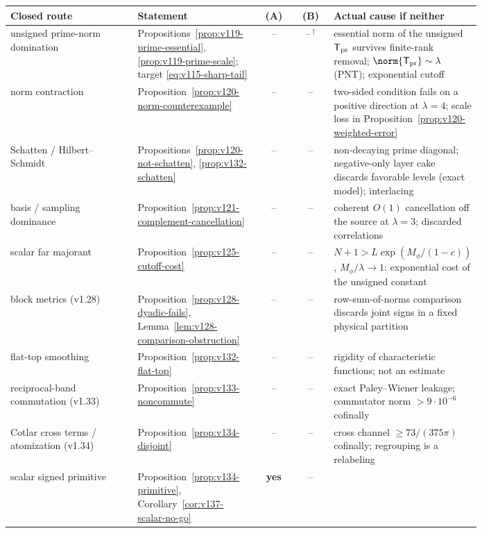 \begin{table}[t]
\centering\small
\setlength{\tabcolsep}{4pt}
\renewcommand{\arraystretch}{1.15}
\begin{tabular}{@{}p{0.27\linewidth}p{0.26\linewidth}cc p{0.26\linewidth}@{}}
\toprule
Closed route & Statement & (A) & (B) & Actual cause if neither\\
\midrule
unsigned prime-norm domination &
Propositions~\ref{prop:v119-prime-essential}, \ref{prop:v119-prime-scale};
target \eqref{eq:v115-sharp-tail} & -- & --\,$^{\dagger}$ &
essential norm of the unsigned $\mathsf T_{\rm pr}$ survives finite-rank
removal; $\norm{\mathsf T_{\rm pr}}\sim\lambda$ (PNT); exponential cutoff\\
norm contraction &
Proposition~\ref{prop:v120-norm-counterexample} & -- & -- &
two-sided condition fails on a positive direction at $\lambda=4$;
scale loss in Proposition~\ref{prop:v120-weighted-error}\\
Schatten / Hilbert--Schmidt &
Propositions~\ref{prop:v120-not-schatten}, \ref{prop:v132-schatten} & -- & -- &
non-decaying prime diagonal; negative-only layer cake discards favorable
levels (exact model); interlacing\\
basis / sampling dominance &
Proposition~\ref{prop:v121-complement-cancellation} & -- & -- &
coherent $O(1)$ cancellation off the source at $\lambda=3$; discarded
correlations\\
scalar far majorant &
Proposition~\ref{prop:v125-cutoff-cost} & -- & -- &
$N+1>L\exp(M_\phi/(1-c))$, $M_\phi/\lambda\to1$: exponential cost of the
unsigned constant\\
block metrics (v1.28) &
Proposition~\ref{prop:v128-dyadic-fails},
Lemma~\ref{lem:v128-comparison-obstruction} & -- & -- &
row-sum-of-norms comparison discards joint signs in a fixed physical
partition\\
flat-top smoothing &
Proposition~\ref{prop:v132-flat-top} & -- & -- &
rigidity of characteristic functions; not an estimate\\
reciprocal-band commutation (v1.33) &
Proposition~\ref{prop:v133-noncommute} & -- & -- &
exact Paley--Wiener leakage; commutator norm $>9\cdot10^{-6}$ cofinally\\
Cotlar cross terms / atomization (v1.34) &
Proposition~\ref{prop:v134-disjoint} & -- & -- &
cross channel $\ge73/(375\pi)$ cofinally; regrouping is a relabeling\\
scalar signed primitive &
Proposition~\ref{prop:v134-primitive},
Corollary~\ref{cor:v137-scalar-no-go} & \textbf{yes} & -- &

\end{tabular}
\end{table}
